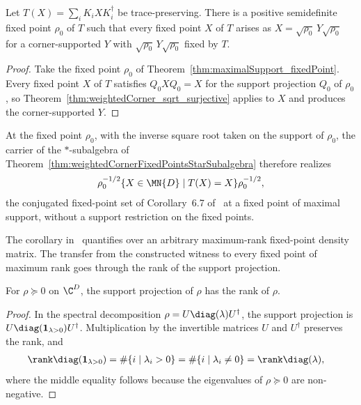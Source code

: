 \begin{theorem}%
    \label{thm:maximalSupport_weightedCorner}
    \leanok
    Let $T(X)=\sum_iK_iXK_i^\dagger$ be trace-preserving. There is a
    positive semidefinite fixed point $\rho_0$ of $T$ such that every fixed
    point $X$ of $T$ arises as
    $X=\sqrt{\rho_0}\,Y\sqrt{\rho_0}$ for a corner-supported $Y$ with
    $\sqrt{\rho_0}\,Y\sqrt{\rho_0}$ fixed by $T$.
\end{theorem}

\begin{proof}
    \leanok
    Take the fixed point $\rho_0$ of
    Theorem~\ref{thm:maximalSupport_fixedPoint}. Every fixed point $X$ of
    $T$ satisfies $Q_0XQ_0=X$ for the support projection $Q_0$ of
    $\rho_0$, so Theorem~\ref{thm:weightedCorner_sqrt_surjective} applies
    to $X$ and produces the corner-supported $Y$.
\end{proof}

At the fixed point $\rho_0$, with the inverse square root taken on the
support of $\rho_0$, the carrier of the $*$-subalgebra of
Theorem~\ref{thm:weightedCornerFixedPointsStarSubalgebra} therefore realizes
\begin{align}
    \rho_0^{-1/2}
    \{X\in\MN{D}\mid T(X)=X\}
    \rho_0^{-1/2},
    \notag
\end{align}
the conjugated fixed-point set of Corollary~6.7 of~\cite{Wolf2012Quantum}
at a fixed point of maximal support, without a support restriction on the
fixed points.

The corollary in~\cite{Wolf2012Quantum} quantifies over an arbitrary
maximum-rank fixed-point density matrix. The transfer from the constructed
witness to every fixed point of maximum rank goes through the rank of the
support projection.

\begin{lemma}%
    \label{lem:rank_stationaryProj}
    \leanok
    For $\rho\succeq0$ on $\C^D$, the support projection of $\rho$ has the
    rank of $\rho$.
\end{lemma}

\begin{proof}
    \leanok
    In the spectral decomposition
    $\rho=U\diag(\lambda)U^\dagger$, the support projection is
    $U\diag(\mathbf 1_{\lambda>0})U^\dagger$. Multiplication by the
    invertible matrices $U$ and $U^\dagger$ preserves the rank, and
    \begin{align}
        \rank\diag(\mathbf 1_{\lambda>0})
         & =\#\{i\mid\lambda_i>0\}
        =\#\{i\mid\lambda_i\neq0\}
        =\rank\diag(\lambda),
        \notag
    \end{align}
    where the middle equality follows because the eigenvalues of
    $\rho\succeq0$ are non-negative.
\end{proof}

